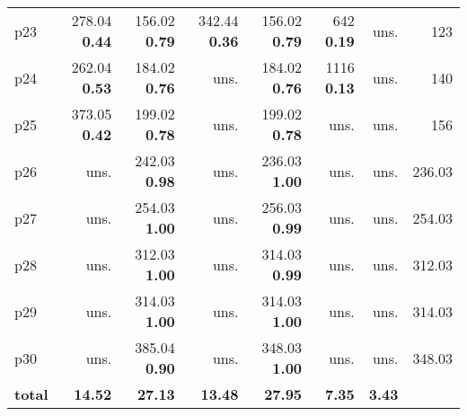 \begin{tabular}{|l|rrrrrr|r|}
p23 & {\footnotesize 278.04} \textbf{0.44} & {\footnotesize 156.02} \textbf{0.79} & {\footnotesize 342.44} \textbf{0.36} & {\footnotesize 156.02} \textbf{0.79} & {\footnotesize 642} \textbf{0.19} & uns. & 123\\
p24 & {\footnotesize 262.04} \textbf{0.53} & {\footnotesize 184.02} \textbf{0.76} & uns. & {\footnotesize 184.02} \textbf{0.76} & {\footnotesize 1116} \textbf{0.13} & uns. & 140\\
p25 & {\footnotesize 373.05} \textbf{0.42} & {\footnotesize 199.02} \textbf{0.78} & uns. & {\footnotesize 199.02} \textbf{0.78} & uns. & uns. & 156\\
p26 & uns. & {\footnotesize 242.03} \textbf{0.98} & uns. & {\footnotesize 236.03} \textbf{1.00} & uns. & uns. & 236.03\\
p27 & uns. & {\footnotesize 254.03} \textbf{1.00} & uns. & {\footnotesize 256.03} \textbf{0.99} & uns. & uns. & 254.03\\
p28 & uns. & {\footnotesize 312.03} \textbf{1.00} & uns. & {\footnotesize 314.03} \textbf{0.99} & uns. & uns. & 312.03\\
p29 & uns. & {\footnotesize 314.03} \textbf{1.00} & uns. & {\footnotesize 314.03} \textbf{1.00} & uns. & uns. & 314.03\\
p30 & uns. & {\footnotesize 385.04} \textbf{0.90} & uns. & {\footnotesize 348.03} \textbf{1.00} & uns. & uns. & 348.03\\
\hline
\textbf{total} & \textbf{14.52} & \textbf{27.13} & \textbf{13.48} & \textbf{27.95} & \textbf{7.35} & \textbf{3.43} & \\
\hline
\end{tabular}

